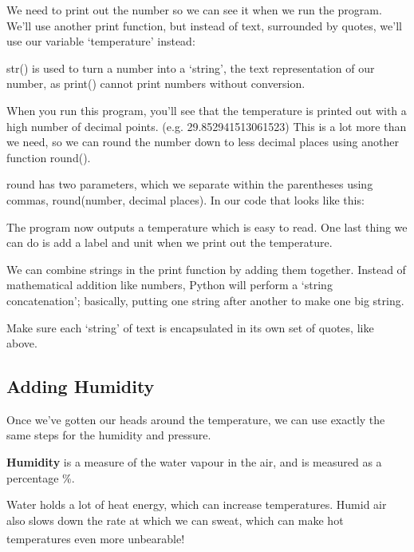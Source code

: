 \documentclass[a4paper, twocolumn, twoside, 12pt]{article}
\newenvironment{aside}
		{
		\begin{mdframed}[
			style=0,%
			leftline=false,
			rightline=false,
			innerbottommargin=2pt,
			innerleftmargin=12pt,
			innerrightmargin=0pt,
			linewidth=0.75pt,
			skipabove=6pt,
			skipbelow=6pt
			]
				\small
				\color{JungleGreen}
				\setlength{\parskip}{2pt}
				\vspace{2pt} %
		}
		{
		\end{mdframed}
		}
\begin{document}
		We need to print out the number so we can see it when we run the program. We'll use another print function, but instead of text, surrounded by quotes, we'll use our variable `temperature' instead:
		
		
		
		str() is used to turn a number into a `string', the text representation of our number, as print() cannot print numbers without conversion.
		
		When you run this program, you'll see that the temperature is printed out with a high number of decimal points. (e.g. 29.852941513061523)
		This is a lot more than we need, so we can round the number down to less decimal places using another function round().
		
		round has two parameters, which we separate within the parentheses using commas, round(number, decimal places). In our code that looks like this:
		
		
		
		The program now outputs a temperature which is easy to read.
		One last thing we can do is add a label and unit when we print out the temperature.
		
		We can combine strings in the print function by adding them together.
		Instead of mathematical addition like numbers, Python will perform a `string concatenation'; basically, putting one string after another to make one big string.
		
		
		
		Make sure each `string' of text is encapsulated in its own set of quotes, like above.
		
		\subsection*{Adding Humidity}
		
		Once we've gotten our heads around the temperature, we can use exactly the same steps for the humidity and pressure.
		
		\begin{aside}
			\textbf{Humidity} is a measure of the water vapour in the air, and is measured as a percentage \%.
			
			Water holds a lot of heat energy, which can increase temperatures. Humid air also slows down the rate at which we can sweat, which can make hot temperatures even more unbearable!\textsuperscript{\cite{humidity}}
		\end{aside}
		
\end{document}
